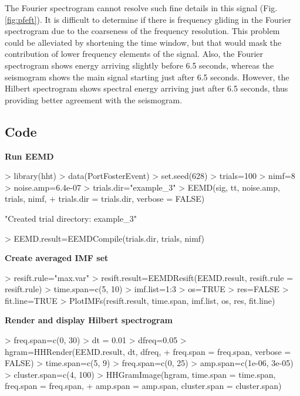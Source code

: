 \documentclass[12pt]{article}
\begin{document}
The Fourier spectrogram cannot resolve such fine details in this signal (Fig. \ref{fig:pfeft}).
It is difficult to determine if there is frequency gliding in the Fourier spectrogram due to the coarseness of the frequency resolution.
This problem could be alleviated by shortening the time window, but that would mask the contribution of lower frequency elements of the signal.
Also, the Fourier spectrogram shows energy arriving slightly before 6.5 seconds, whereas the seismogram shows the main signal starting just after 6.5 seconds.
However, the Hilbert spectrogram shows spectral energy arriving just after 6.5 seconds, thus providing better agreement with the seismogram.

\subsection{Code}

\textbf{Run EEMD}

\begin{Schunk}
\begin{Sinput}
> library(hht)
> data(PortFosterEvent)
> set.seed(628)
> trials=100
> nimf=8
> noise.amp=6.4e-07
> trials.dir="example_3"
> EEMD(sig, tt, noise.amp, trials, nimf, 
+     trials.dir = trials.dir, verbose = FALSE)
\end{Sinput}
\begin{Soutput}
[1] "Created trial directory: example_3"
\end{Soutput}
\begin{Sinput}
> EEMD.result=EEMDCompile(trials.dir, trials, nimf)
\end{Sinput}
\end{Schunk}

\textbf{Create averaged IMF set}

\begin{Schunk}
\begin{Sinput}
> resift.rule="max.var"
> resift.result=EEMDResift(EEMD.result, resift.rule = resift.rule)
> time.span=c(5, 10)
> imf.list=1:3
> os=TRUE
> res=FALSE
> fit.line=TRUE
> PlotIMFs(resift.result, time.span, imf.list, os, res, fit.line)
\end{Sinput}
\end{Schunk}

\textbf{Render and display Hilbert spectrogram}
\begin{Schunk}
\begin{Sinput}
> freq.span=c(0, 30)
> dt = 0.01
> dfreq=0.05
> hgram=HHRender(EEMD.result, dt, dfreq, 
+     freq.span = freq.span, verbose = FALSE)
> time.span=c(5, 9)
> freq.span=c(0, 25)
> amp.span=c(1e-06, 3e-05)
> cluster.span=c(4, 100)
> HHGramImage(hgram, time.span = time.span, freq.span = freq.span,
+     amp.span = amp.span, cluster.span = cluster.span)
\end{Sinput}
\end{Schunk}
\end{document}
